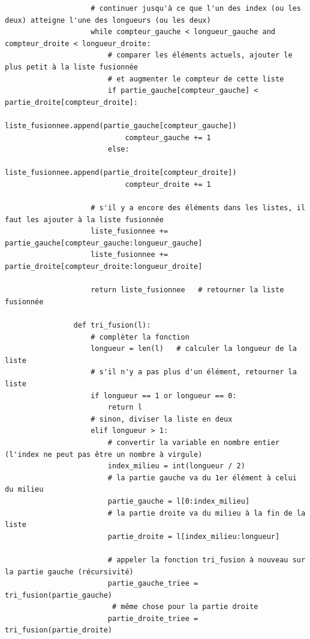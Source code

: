 \begin{Exercice} [30 minutes]
\begin{verbatim}
                    # continuer jusqu'à ce que l'un des index (ou les deux) atteigne l'une des longueurs (ou les deux)
                    while compteur_gauche < longueur_gauche and compteur_droite < longueur_droite:
                        # comparer les éléments actuels, ajouter le plus petit à la liste fusionnée 
                        # et augmenter le compteur de cette liste
                        if partie_gauche[compteur_gauche] < partie_droite[compteur_droite]:
                            liste_fusionnee.append(partie_gauche[compteur_gauche])
                            compteur_gauche += 1
                        else:
                            liste_fusionnee.append(partie_droite[compteur_droite])
                            compteur_droite += 1
                    
                    # s'il y a encore des éléments dans les listes, il faut les ajouter à la liste fusionnée
                    liste_fusionnee += partie_gauche[compteur_gauche:longueur_gauche]
                    liste_fusionnee += partie_droite[compteur_droite:longueur_droite]
                    
                    return liste_fusionnee   # retourner la liste fusionnée
                
                def tri_fusion(l):
                    # complèter la fonction
                    longueur = len(l)   # calculer la longueur de la liste
                    # s'il n'y a pas plus d'un élément, retourner la liste
                    if longueur == 1 or longueur == 0:
                        return l
                    # sinon, diviser la liste en deux
                    elif longueur > 1:
                        # convertir la variable en nombre entier (l'index ne peut pas être un nombre à virgule)
                        index_milieu = int(longueur / 2)   
                        # la partie gauche va du 1er élément à celui du milieu
                        partie_gauche = l[0:index_milieu] 
                        # la partie droite va du milieu à la fin de la liste
                        partie_droite = l[index_milieu:longueur]   
                        
                        # appeler la fonction tri_fusion à nouveau sur la partie gauche (récursivité)
                        partie_gauche_triee = tri_fusion(partie_gauche)
                         # même chose pour la partie droite
                        partie_droite_triee = tri_fusion(partie_droite)  
                        

\end{verbatim}
\end{Exercice}
